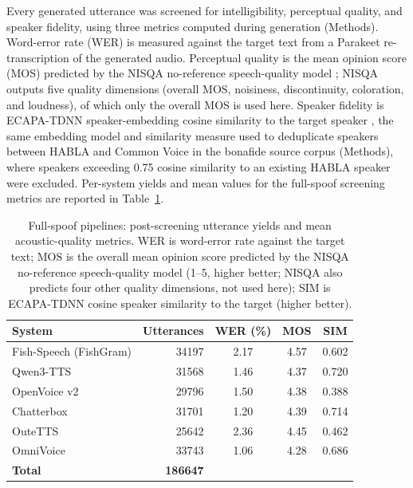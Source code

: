 \documentclass[11pt]{article}
\begin{document}
Every generated utterance was screened for intelligibility, perceptual
quality, and speaker fidelity, using three metrics computed during
generation (Methods). Word-error rate (WER) is measured against the
target text from a Parakeet re-transcription of the generated audio.
Perceptual quality is the mean opinion score (MOS) predicted by the
NISQA no-reference speech-quality model \citep{nisqa}; NISQA outputs
five quality dimensions (overall MOS, noisiness, discontinuity,
coloration, and loudness), of which only the overall MOS is used here.
Speaker fidelity is ECAPA-TDNN speaker-embedding cosine similarity to
the target speaker \citep{ecapa}, the same embedding model and
similarity measure used to deduplicate speakers between HABLA and Common
Voice in the bonafide source corpus (Methods), where speakers exceeding
0.75 cosine similarity to an existing HABLA speaker were excluded.
Per-system yields and mean values for the full-spoof screening metrics
are reported in Table~\ref{tab:fullspoof}.

\begin{table}[t]
\centering
\caption{Full-spoof pipelines: post-screening utterance yields and mean
acoustic-quality metrics. WER is word-error rate against the target
text; MOS is the overall mean opinion score predicted by the NISQA
no-reference speech-quality model \citep{nisqa} (1--5, higher better;
NISQA also predicts four other quality dimensions, not used here); SIM
is ECAPA-TDNN cosine speaker similarity to the target (higher better).}
\label{tab:fullspoof}
\small
\begin{tabular}{lrccc}
\toprule
\textbf{System} & \textbf{Utterances} & \textbf{WER (\%)} & \textbf{MOS} & \textbf{SIM} \\
\midrule
Fish-Speech (FishGram) & 34197 & 2.17 & 4.57 & 0.602 \\
Qwen3-TTS              & 31568 & 1.46 & 4.37 & 0.720 \\
OpenVoice v2           & 29796 & 1.50 & 4.38 & 0.388 \\
Chatterbox             & 31701 & 1.20 & 4.39 & 0.714 \\
OuteTTS                & 25642 & 2.36 & 4.45 & 0.462 \\
OmniVoice              & 33743 & 1.06 & 4.28 & 0.686 \\
\midrule
\textbf{Total}         & \textbf{186647} & & & \\
\bottomrule
\end{tabular}
\end{table}
\end{document}

